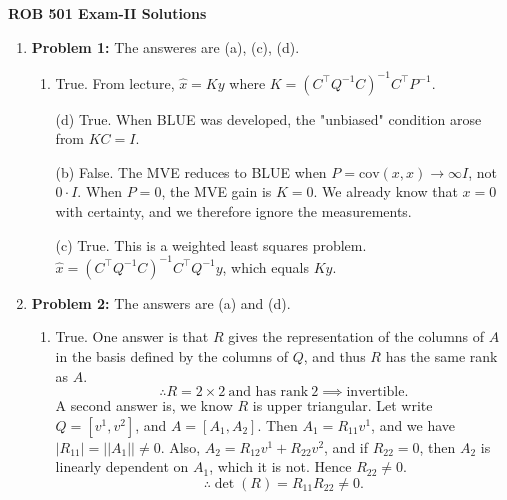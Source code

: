 \documentclass[letterpaper]{article}
\begin{document}
\newcommand{\trace}{\mathrm{trace}}
\newcommand{\real}{\mathbb R}  %
\newcommand{\nat}{\mathbb R}   %
\newcommand{\cp}{\mathbb C}    %
\newcommand{\ds}{\displaystyle}
\newcommand{\mf}[2]{\frac{\ds #1}{\ds #2}}
\newcommand{\book}[2]{{Luenberger, Page~#1, }{Prob.~#2}}
\newcommand{\spanof}[1]{\textrm{span} \{ #1 \}}
  \newcommand{\Covof}[2]{ \mathrm{cov} \left(#1,#2\right)}
\parindent 0pt


\begin{center}
{\large \bf ROB 501 Exam-II Solutions}
\end{center}

\vspace*{1cm}

\begin{enumerate}
\item \noindent \textbf{Problem 1:}
The answeres are (a), (c), (d).
\begin{enumerate}
\setlength{\itemsep}{.1in}
\renewcommand{\labelenumi}{(\alph{enumi})}
\item True. From lecture, $\hat{x} = Ky$ where $K = (C^\top Q^{-1}C)^{-1}C^\top P^{-1}.$

\item[(d)] True. When BLUE was developed, the "unbiased" condition arose from $KC = I.$

\item[(b)] False. The MVE reduces to BLUE when $P = \Covof{x}{x}\rightarrow \infty I$, not $0\cdot I$. When $P = 0$, the MVE gain is $K = 0$. We already know that $x = 0$ with certainty, and we therefore ignore the measurements.

\item[(c)] True. This is a weighted least squares problem. $\hat{x} = (C^\top Q^{-1}C)^{-1}C^\top Q^{-1} y$, which equals $Ky$.
\end{enumerate}

\item \noindent \textbf{Problem 2:}
The answers are (a) and (d).
\begin{enumerate}
\setlength{\itemsep}{.1in}
\renewcommand{\labelenumi}{(\alph{enumi})}
\item True. One answer is that $R$ gives the representation of the columns of $A$ in the basis defined by the columns of $Q$, and thus $R$ has the same rank as $A$.
$$\therefore R = 2\times 2 ~ \text{and has rank}~ 2 \implies \text{invertible}.$$
A second answer is, we know $R$ is upper triangular. Let write $Q=[v^1, v^2]$, and $A=[A_1, A_2].$ Then $A_1 = R_{11}v^1$, and we have $|R_{11}| = ||A_1|| \neq 0.$ Also, $A_2 = R_{12}v^1+R_{22}v^2$, and if $R_{22} = 0$, then $A_2$ is linearly dependent on $A_1$, which it is not. Hence $R_{22} \neq 0$.
$$\therefore \det(R) = R_{11} R_{22} \neq 0.$$


\end{enumerate}
\end{enumerate}
\end{document}
